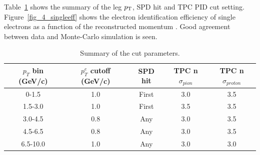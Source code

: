 {Table~\ref{table_4_cutset} shows the summary of the leg $p_{\rm{T}}$, SPD hit and TPC PID cut setting.
Figure~\ref{fig_4_singleeff} shows the electron identification efficiency of single electrons as a function of the reconstructed momentum . 
Good agreement between data and Monte-Carlo simulation is seen. 
\begin{table}[!h]
  \centering
    \begin{tabular}{ccccc} \hline
      $p_{T}$ bin (GeV/c)  & $p^{e}_{T}$ cutoff (GeV/c) & SPD hit & TPC n$\sigma_{pion}$ & TPC n$\sigma_{proton}$\\ \hline
      0-1.5                &  1.0  & First   &     3.0                           & 3.5                                      \\ 
      1.5-3.0              & 1.0  & First   &     3.5                          & 3.5                                      \\ 
      3.0-4.5              & 0.8  & Any     &     3.0                           & 3.5                                      \\ 
      4.5-6.5              & 0.8  & Any     &     3.0                           & 3.5                                      \\ 
      6.5-10.0             & 1.0  & Any     &     3.0                           & 3.0                                      \\  \hline
    \end{tabular}
    \caption{Summary of the cut parameters.}
    	\label{table_4_cutset}
\end{table}

}

